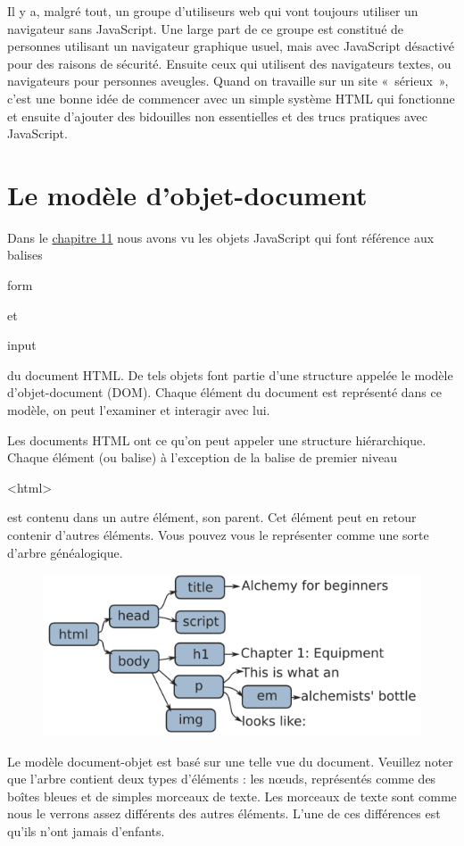 \documentclass{FramateX}
\renewcommand{\texttt}[1]{\begin{sffamily}{#1}\end{sffamily}}
\begin{document}
Il y a, malgré tout, un groupe d'utiliseurs web qui vont toujours
utiliser un navigateur sans JavaScript. Une large part de ce groupe est
constitué de personnes utilisant un navigateur graphique usuel, mais
avec JavaScript désactivé pour des raisons de sécurité. Ensuite ceux qui
utilisent des navigateurs textes, ou navigateurs pour personnes
aveugles. Quand on travaille sur un site «~sérieux~», c'est une bonne
idée de commencer avec un simple système HTML qui fonctionne et ensuite
d'ajouter des bidouilles non essentielles et des trucs pratiques avec
JavaScript.


\chapter{Le modèle d'objet-document}

Dans le \href{chapter11.html}{chapitre 11} nous avons vu les objets
JavaScript qui font référence aux balises \texttt{form} et
\texttt{input} du document HTML. De tels objets font partie d'une
structure appelée le modèle d'objet-document (DOM). Chaque élément du
document est représenté dans ce modèle, on peut l'examiner et interagir
avec lui.

Les documents HTML ont ce qu'on peut appeler une structure hiérarchique.
Chaque élément (ou balise) à l'exception de la balise de premier niveau
\texttt{\textless{}html\textgreater{}} est contenu dans un autre
élément, son parent. Cet élément peut en retour contenir d'autres
éléments. Vous pouvez vous le représenter comme une sorte d'arbre
généalogique.

\begin{figure}[ht!]
\centering
\includegraphics{img/html.png}
\caption{}
\end{figure}

Le modèle document-objet est basé sur une telle vue du document.
Veuillez noter que l'arbre contient deux types d'éléments : les nœuds,
représentés comme des boîtes bleues et de simples morceaux de texte. Les
morceaux de texte sont comme nous le verrons assez différents des autres
éléments. L'une de ces différences est qu'ils n'ont jamais d'enfants.
\end{document}

